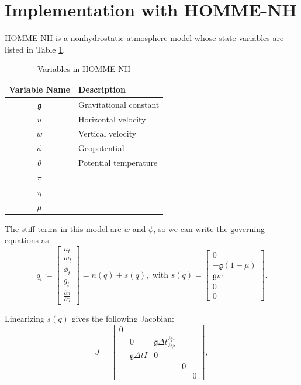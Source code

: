 \documentclass{csri19}
\newcommand{\CFKg}{\mathfrak{g}}
\begin{document}
\section{Implementation with HOMME-NH}\label{CFK:sec:homme}
HOMME-NH is a nonhydrostatic atmosphere model whose state variables are
listed in Table \ref{CFK:tab:variables}. 
\begin{table}[ht]
  \caption{Variables in HOMME-NH}
  \label{CFK:tab:variables}
  \begin{center}
    \begin{tabular}{|c|l|}
      \hline
      \textbf{Variable Name} & \textbf{Description} \\
      \hline
      $\CFKg$                            & Gravitational constant \\
      $u$                                & Horizontal velocity    \\
      $w$                                & Vertical velocity      \\
      $\phi$                             & Geopotential           \\
      $\theta$                           & Potential temperature  \\
      $\pi$                              &                        \\
      $\eta$                             &                        \\
      $\mu$                              &                        \\
      \hline
    \end{tabular}
  \end{center}
\end{table}
The stiff terms in this model are 
$w$ and $\phi$, so we can write the governing equations as
\[ q_t \coloneqq \begin{bmatrix} u_t \\
w_t\\
\phi_t\\
\theta_t\\
\frac{\partial \pi}{\partial \eta}
\end{bmatrix} = n(q) + s(q),\text{ with }
 s(q) = \begin{bmatrix}
0\\
-\CFKg (1-\mu)\\
\CFKg w\\
0\\
0\end{bmatrix}.\]

Linearizing $s(q)$ gives the following Jacobian:
\[ J = \begin{bmatrix}
0&                  &                                                   &  & \\
 & 0                & \CFKg \Delta t \frac{\partial \mu}{\partial \phi} &  & \\
 & \CFKg \Delta t I & 0                                                 &  & \\
 &                  &                                                   &0 & \\
 &                  &                                                   &  &0\end{bmatrix},\]
\end{document}
